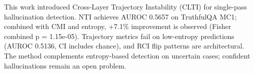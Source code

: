 
This work introduced Cross-Layer Trajectory Instability (CLTI) for single-pass hallucination detection. NTI achieves AUROC 0.5657 on TruthfulQA MC1; combined with CMI and entropy, +7.1\% improvement is observed (Fisher combined p = 1.15e-05). Trajectory metrics fail on low-entropy predictions (AUROC 0.5136, CI includes chance), and RCI flip patterns are architectural. The method complements entropy-based detection on uncertain cases; confident hallucinations remain an open problem.

